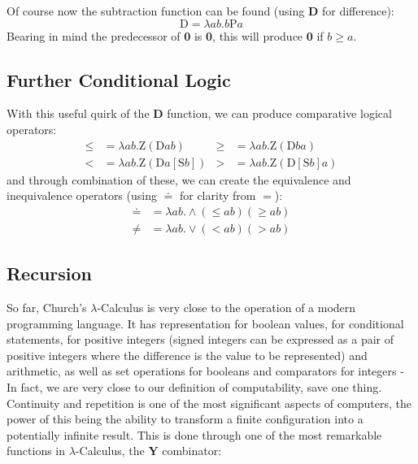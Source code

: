 \documentclass[Master.tex]{subfiles}
\begin{document}
Of course now the subtraction function can be found (using \textbf{D} for difference):
\begin{equation*}
\bm{\mathrm{D}} = \lambda ab.b\bm{\mathrm{P}}a
\end{equation*}
Bearing in mind the predecessor of \textbf{0} is \textbf{0}, this will produce \textbf{0} if $b\geq a$.
\subsection{Further Conditional Logic}

With this useful quirk of the \textbf{D} function, we can produce comparative logical operators:
\begin{equation*}
\begin{aligned}
\bm{\leq} &= \lambda ab.\bm{\mathrm{Z}}(\bm{\mathrm{D}}ab)
  & %
\bm{\geq} &= \lambda ab.\bm{\mathrm{Z}}(\bm{\mathrm{D}}ba)
  \\
\bm{<} &= \lambda ab.\bm{\mathrm{Z}}(\bm{\mathrm{D}}a[\bm{\mathrm{S}}b])
  &
\bm{>} &= \lambda ab.\bm{\mathrm{Z}}(\bm{\mathrm{D}}[\bm{\mathrm{S}}b]a)
\end{aligned}
\end{equation*}
and through combination of these, we can create the equivalence and inequivalence operators (using $\bm{\doteq}$ for clarity from $=$):
\begin{equation*}
\begin{aligned}
\bm{\doteq} &= \lambda ab.\wedge(\bm{\leq}ab)(\bm{\geq}ab)\\
\bm{\neq} &= \lambda ab.\vee(\bm{<}ab)(\bm{>}ab)
\end{aligned}
\end{equation*}
\subsection{Recursion}

So far, Church's $\lambda$-Calculus is very close to the operation of a modern programming language. It has representation for boolean values, for conditional statements, for positive integers (signed integers can be expressed as a pair of positive integers where the difference is the value to be represented) and arithmetic, as well as set operations for booleans and comparators for integers - In fact, we are very close to our definition of computability, save one thing. Continuity and repetition is one of the most significant aspects of computers, the power of this being the ability to transform a finite configuration into a potentially infinite result. This is done through one of the most remarkable functions in $\lambda$-Calculus, the \textbf{Y} combinator:
\end{document}
